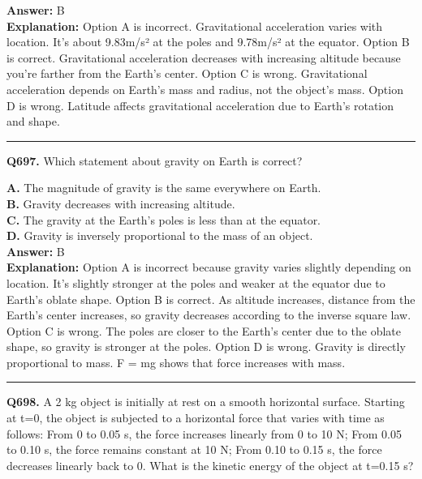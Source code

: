 \documentclass[12pt]{article}
\begin{document}
\textbf{Answer:} B \\
\textbf{Explanation:} Option A is incorrect. Gravitational acceleration varies with location. It's about 9.83m/s² at the poles and 9.78m/s² at the equator.
Option B is correct. Gravitational acceleration decreases with increasing altitude because you're farther from the Earth's center.
Option C is wrong. Gravitational acceleration depends on Earth's mass and radius, not the object's mass.
Option D is wrong. Latitude affects gravitational acceleration due to Earth's rotation and shape.

\hrule
\vspace{1em}


\noindent
\textbf{Q697.} Which statement about gravity on Earth is correct?



\textbf{A.} The magnitude of gravity is the same everywhere on Earth. \\
\textbf{B.} Gravity decreases with increasing altitude. \\
\textbf{C.} The gravity at the Earth's poles is less than at the equator. \\
\textbf{D.} Gravity is inversely proportional to the mass of an object. \\

\textbf{Answer:} B \\
\textbf{Explanation:} Option A is incorrect because gravity varies slightly depending on location. It's slightly stronger at the poles and weaker at the equator due to Earth's oblate shape.
Option B is correct. As altitude increases, distance from the Earth's center increases, so gravity decreases according to the inverse square law.
Option C is wrong. The poles are closer to the Earth's center due to the oblate shape, so gravity is stronger at the poles.
Option D is wrong. Gravity is directly proportional to mass.
F
=
mg
shows that force increases with mass.

\hrule
\vspace{1em}


\noindent
\textbf{Q698.} A 2 kg object is initially at rest on a smooth horizontal surface. Starting at t=0, the object is subjected to a horizontal force that varies with time as follows:
From 0 to 0.05 s, the force increases linearly from 0 to 10 N;
From 0.05 to 0.10 s, the force remains constant at 10 N;
From 0.10 to 0.15 s, the force decreases linearly back to 0.
What is the kinetic energy of the object at t=0.15 s?
\end{document}
